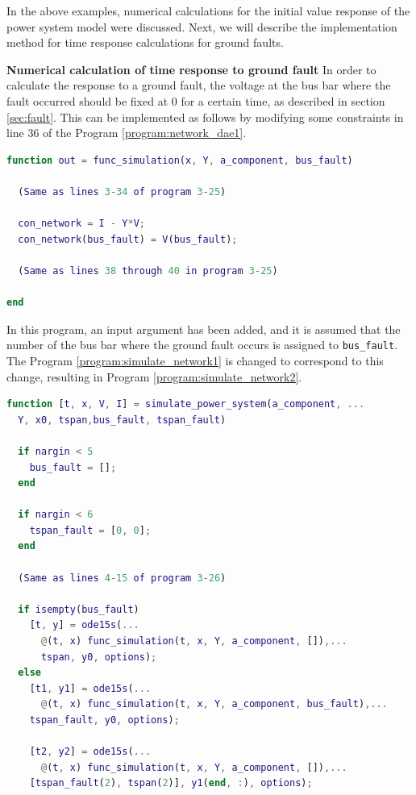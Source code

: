 \documentclass[graybox, envcountchap]{svmult}
\begin{document}
In the above examples, numerical calculations for the initial value response of
the power system model were discussed. Next, we will describe the implementation
method for time response calculations for ground faults.

\begin{example}{\textbf{Numerical calculation of time response to ground fault}}
In order to calculate the response to a ground fault, the voltage at the bus bar
where the fault occurred should be fixed at $0$ for a certain time, as described
in section \ref{sec:fault}. This can be implemented as follows by modifying
some constraints in line 36 of the Program \nobreak\ref{program:network_dae1}.


\begin{lstlisting}[language=Matlab, caption=func\_simulation.m, label={program:network_dae_fault}]
function out = func_simulation(x, Y, a_component, bus_fault)

  (Same as lines 3-34 of program 3-25)

  con_network = I - Y*V;
  con_network(bus_fault) = V(bus_fault);

  (Same as lines 38 through 40 in program 3-25)

end
\end{lstlisting}

In this program, an input argument has been added, and it is assumed that the
number of the bus bar where the ground fault occurs is assigned to
\verb|bus_fault|. The Program \nobreak\ref{program:simulate_network1} is
changed to correspond to this change, resulting in Program
\ref{program:simulate_network2}.


\begin{lstlisting}[language=Matlab, caption=simulate\_power\_system.m, label={program:simulate_network2}]
function [t, x, V, I] = simulate_power_system(a_component, ...
  Y, x0, tspan,bus_fault, tspan_fault)

  if nargin < 5
    bus_fault = [];
  end

  if nargin < 6
    tspan_fault = [0, 0];
  end

  (Same as lines 4-15 of program 3-26)

  if isempty(bus_fault)
    [t, y] = ode15s(...
      @(t, x) func_simulation(t, x, Y, a_component, []),...
      tspan, y0, options);
  else
    [t1, y1] = ode15s(...
      @(t, x) func_simulation(t, x, Y, a_component, bus_fault),...
    tspan_fault, y0, options);
    
    [t2, y2] = ode15s(...
      @(t, x) func_simulation(t, x, Y, a_component, []),...
    [tspan_fault(2), tspan(2)], y1(end, :), options);


\end{lstlisting}
\end{example}
\end{document}
